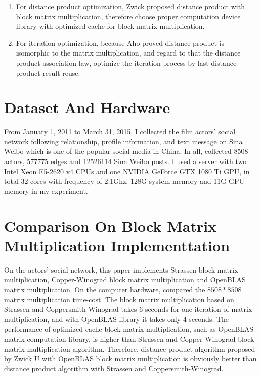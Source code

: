 \documentclass[review]{cvpr}
\begin{document}
\begin{enumerate}
\item For distance product optimization, Zwick proposed distance product with block matrix multiplication, therefore choose proper computation device library with optimized cache for block matrix multiplication.
\item For iteration optimization, because Aho proved distance product is isomorphic to the matrix multiplication, and regard to that the distance product association law, optimize the iteration process by last distance product result reuse.
\end{enumerate}


\section{Dataset And Hardware}
From January 1, 2011 to March 31, 2015, I collected the film actors' social network following relationship, profile information, and text message on Sina Weibo which is one of the popular social media in China.
In all, collected 8508 actors, 577775 edges and 12526114 Sina Weibo posts.
I used a server with two Intel Xeon E5-2620 v4 CPUs and one NVIDIA GeForce GTX 1080 Ti GPU, in total 32 cores with frequency of 2.1Ghz, 128G system memory and 11G GPU memory in my experiment.



\section{Comparison On Block Matrix Multiplication Implementtation}
On the actors' social network, this paper implements Strassen block matrix multiplication, Copper-Winograd block matrix multiplication and OpenBLAS matrix multiplication. On the computer hardware, compared the $8508*8508$ matrix multiplication time-cost.
The block matrix multiplication based on Strassen and Coppersmith-Winograd takes 6 seconds for one iteration of matrix multiplication, and with OpenBLAS library it takes only 4 seconds.
The performance of optimized cache block matrix multiplication, such as OpenBLAS matrix computation library, is higher than Strassen and Copper-Winograd block matrix multiplication algorithm.
Therefore, distance product algorithm proposed by Zwick U with OpenBLAS block matrix multiplication is obviously better than distance product algorithm with Strassen and Coppersmith-Winograd.
\end{document}
